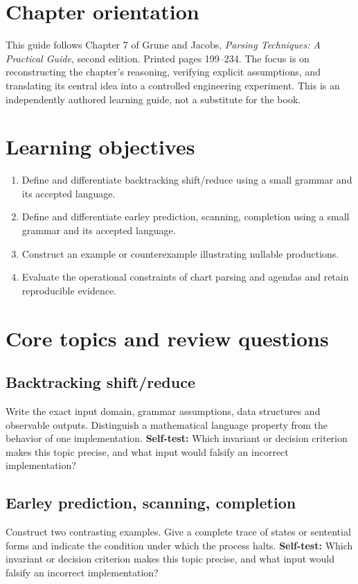 \documentclass[11pt,letterpaper]{article}
\begin{document}
\makedoctitle\makedocsummary
\tableofcontents\clearpage
\section{Chapter orientation}
This guide follows Chapter 7 of Grune and Jacobs, \emph{Parsing Techniques: A Practical Guide}, second edition. Printed pages 199--234. The focus is on reconstructing the chapter's reasoning, verifying explicit assumptions, and translating its central idea into a controlled engineering experiment. This is an independently authored learning guide, not a substitute for the book.
\section{Learning objectives}
\begin{enumerate}
\item Define and differentiate backtracking shift/reduce using a small grammar and its accepted language.
\item Define and differentiate earley prediction, scanning, completion using a small grammar and its accepted language.
\item Construct an example or counterexample illustrating nullable productions.
\item Evaluate the operational constraints of chart parsing and agendas and retain reproducible evidence.
\end{enumerate}
\section{Core topics and review questions}
\subsection{Backtracking shift/reduce}
Write the exact input domain, grammar assumptions, data structures and observable outputs. Distinguish a mathematical language property from the behavior of one implementation.
\textbf{Self-test:} Which invariant or decision criterion makes this topic precise, and what input would falsify an incorrect implementation?
\subsection{Earley prediction, scanning, completion}
Construct two contrasting examples. Give a complete trace of states or sentential forms and indicate the condition under which the process halts.
\textbf{Self-test:} Which invariant or decision criterion makes this topic precise, and what input would falsify an incorrect implementation?
\end{document}
